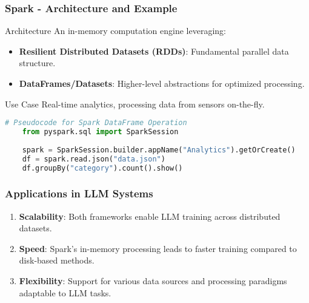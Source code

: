 \documentclass[aspectratio=169]{beamer}
\begin{document}
\begin{frame}[fragile]
    \frametitle{Spark - Architecture and Example}
    \begin{block}{Architecture}
        An in-memory computation engine leveraging:
        \begin{itemize}
            \item \textbf{Resilient Distributed Datasets (RDDs)}: Fundamental parallel data structure.
            \item \textbf{DataFrames/Datasets}: Higher-level abstractions for optimized processing.
        \end{itemize}
    \end{block}
    \begin{block}{Use Case}
        Real-time analytics, processing data from sensors on-the-fly.
    \end{block}
    \begin{lstlisting}[language=Python]
    # Pseudocode for Spark DataFrame Operation
    from pyspark.sql import SparkSession
    
    spark = SparkSession.builder.appName("Analytics").getOrCreate()
    df = spark.read.json("data.json")
    df.groupBy("category").count().show()
    \end{lstlisting}
\end{frame}

\begin{frame}[fragile]
    \frametitle{Applications in LLM Systems}
    \begin{enumerate}
        \item \textbf{Scalability}: Both frameworks enable LLM training across distributed datasets.
        \item \textbf{Speed}: Spark's in-memory processing leads to faster training compared to disk-based methods.
        \item \textbf{Flexibility}: Support for various data sources and processing paradigms adaptable to LLM tasks.
    \end{enumerate}
\end{frame}
\end{document}
